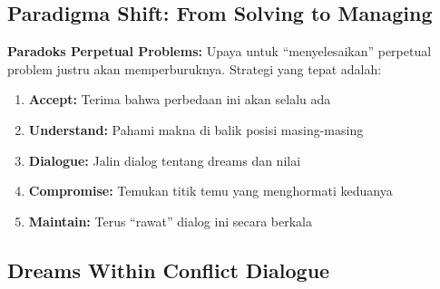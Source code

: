 \subsection{Paradigma Shift: From Solving to Managing}

\begin{insightbox}
\textbf{Paradoks Perpetual Problems:} Upaya untuk ``menyelesaikan'' perpetual problem justru akan memperburuknya. Strategi yang tepat adalah:
\begin{enumerate}
    \item \textbf{Accept:} Terima bahwa perbedaan ini akan selalu ada
    \item \textbf{Understand:} Pahami makna di balik posisi masing-masing
    \item \textbf{Dialogue:} Jalin dialog tentang dreams dan nilai
    \item \textbf{Compromise:} Temukan titik temu yang menghormati keduanya
    \item \textbf{Maintain:} Terus ``rawat'' dialog ini secara berkala
\end{enumerate}
\end{insightbox}

\subsection{Dreams Within Conflict Dialogue}

